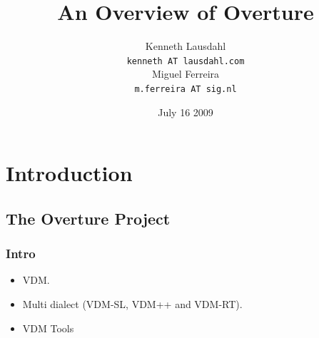 
\usepackage{pgf}
\usepackage{beamerthemesplit}


\newcommand{\pgl}[1]{Peter Gorm Larsen} 
\newcommand{\mail}[1]{{\small \texttt{#1}}}
\newcommand{\yellow}[1]{{\color{yellow} #1}}
\newcommand{\blue}[1]{{\color{blue} #1}}
\newcommand{\red}[1]{{\color{red} #1}}
\newcommand{\green}[1]{{\color{green} #1}}
\newcommand{\fixin}[1]{\fixme[inline]{\texttt{#1}}} 
\newcommand{\fixfo}[1]{\fixme[footnote]{\texttt{#1}}} 
\newcommand{\fixma}[1]{\fixme[margin]{\texttt{#1}}} 
\newcommand{\from}[1]{%
\noindent%
\begin{flushright}%
    \emph{\footnotesize #1}%
\end{flushright}%
} 


\title{An Overview of Overture}

\author[K. Lausdahl, M. Ferreira]{
  Kenneth Lausdahl \\
  \mail{kenneth AT lausdahl.com} \\
  Miguel Ferreira \\
  \mail{m.ferreira AT sig.nl}
}


\date{July 16 2009}



\frame{\titlepage}

\section[Outline]{}
\frame{\tableofcontents}

\section{Introduction}
\subsection{The Overture Project}
\frame
{
  \frametitle{Intro}

  \begin{itemize}
  		\item<1-> VDM.      
		\item<2-> Multi dialect (VDM-SL, VDM++ and VDM-RT).
  		\item<3-> VDM Tools

  \end{itemize}

}


